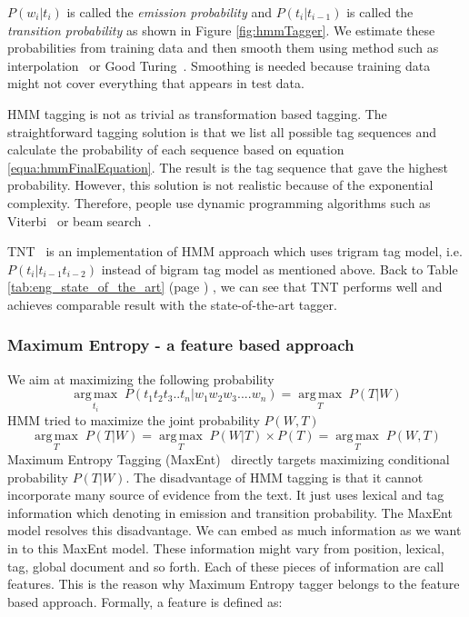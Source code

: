 $ P(w_i|t_i) $ is called the \textit{emission probability} and $P(t_i|t_{i-1})$ is called the \textit{transition probability} as shown in Figure \ref{fig:hmmTagger}. We estimate these probabilities from training data and then smooth them using method such as interpolation~\cite{REINSCH1967} or Good Turing~\cite{Gale94goodturing}. Smoothing is needed because training data might not cover everything that appears in test data. 

HMM tagging is not as trivial as transformation based tagging. The straightforward tagging solution is that we list all possible tag sequences and calculate the probability of each sequence based on equation \ref{equa:hmmFinalEquation}. The result is the tag sequence that gave the highest probability. However, this solution is not realistic because of the exponential complexity. Therefore, people use dynamic programming algorithms such as Viterbi~\cite{Ryan:1993} or beam search~\cite{beamsearch}.

TNT~\cite{TNTTagger} is an implementation of HMM approach which uses trigram tag model, i.e. $P(t_i|t_{i-1}t_{i-2})$ instead of bigram tag model as mentioned above. Back to Table \ref{tab:eng_state_of_the_art} (page \pageref{tab:eng_state_of_the_art}) , we can see that TNT performs well and achieves comparable result with the state-of-the-art tagger.

\subsubsection{Maximum Entropy - a feature based approach}
We aim at maximizing the following probability 
$$ \operatorname*{arg\,max}_{t_i} \;P(t_1t_2t_3..t_n|w_1w_2w_3....w_n) = \operatorname*{arg\,max}_{T} \;P(T|W)$$
HMM tried to maximize the joint probability $P(W,T)$
$$ \operatorname*{arg\,max}_{T} \;P(T|W) = \operatorname*{arg\,max}_{T} \;P(W|T) \times P (T) = \operatorname*{arg\,max}_{T} \;P(W,T) $$
Maximum Entropy Tagging (MaxEnt)~\cite{maximumEntropy} directly targets maximizing conditional probability $P(T|W)$. 
The disadvantage of HMM tagging is that it cannot incorporate many source of evidence from the text. It just uses lexical and tag information which denoting in emission and transition probability. The MaxEnt model resolves this disadvantage. We can embed as much information as we want in to this MaxEnt model. These information might vary from position, lexical, tag, global document and so forth. Each of these pieces of information are call features. This is the reason why Maximum Entropy tagger belongs to the feature based approach. Formally, a feature is defined as: 

